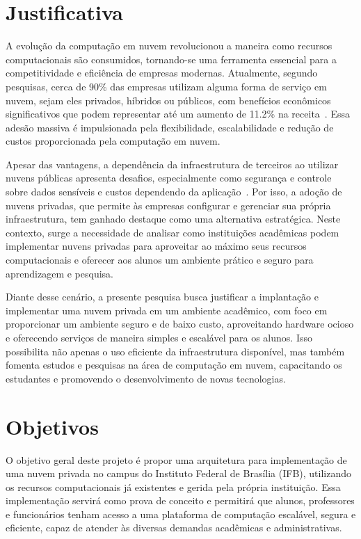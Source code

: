 \section{Justificativa} 

A evolução da computação em nuvem revolucionou a maneira como recursos computacionais são consumidos, tornando-se uma ferramenta essencial para a competitividade e eficiência de empresas modernas. Atualmente, segundo pesquisas, cerca de 90\% das empresas utilizam alguma forma de serviço em nuvem, sejam eles privados, híbridos ou públicos, com benefícios econômicos significativos que podem representar até um aumento de 11.2\% na receita~\citep{StatisticsCloud, ProfitCloud}. Essa adesão massiva é impulsionada pela flexibilidade, escalabilidade e redução de custos proporcionada pela computação em nuvem.

Apesar das vantagens, a dependência da infraestrutura de terceiros ao utilizar nuvens públicas apresenta desafios, especialmente como segurança e controle sobre dados sensíveis e custos dependendo da aplicação~\citep{privateCloudAdvantagesDisadvantages}. Por isso, a adoção de nuvens privadas, que permite às empresas configurar e gerenciar sua própria infraestrutura, tem ganhado destaque como uma alternativa estratégica. Neste contexto, surge a necessidade de analisar como instituições acadêmicas podem implementar nuvens privadas para aproveitar ao máximo seus recursos computacionais e oferecer aos alunos um ambiente prático e seguro para aprendizagem e pesquisa.

Diante desse cenário, a presente pesquisa busca justificar a implantação e implementar uma nuvem privada em um ambiente acadêmico, com foco em proporcionar um ambiente seguro e de baixo custo, aproveitando hardware ocioso e oferecendo serviços de maneira simples e escalável para os alunos. Isso possibilita não apenas o uso eficiente da infraestrutura disponível, mas também fomenta estudos e pesquisas na área de computação em nuvem, capacitando os estudantes e promovendo o desenvolvimento de novas tecnologias.

\section{Objetivos}

O objetivo geral deste projeto é propor uma arquitetura para implementação de uma nuvem privada no campus do Instituto Federal de Brasília (IFB), utilizando os recursos computacionais já existentes e gerida pela própria instituição. Essa implementação servirá como prova de conceito e permitirá que alunos, professores e funcionários tenham acesso a uma plataforma de computação escalável, segura e eficiente, capaz de atender às diversas demandas acadêmicas e administrativas.

